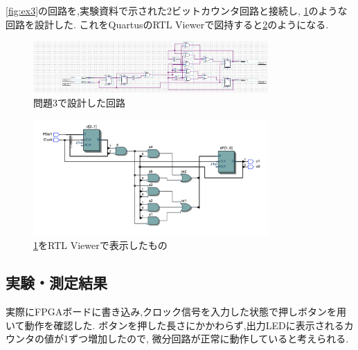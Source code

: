 \documentclass[autodetect-engine, dvi=dvipdfmx, 10pt, a4paper, ja=standard]{bxjsarticle}
\begin{document}
\ref{fig:ex3}の回路を,実験資料で示された2ビットカウンタ回路と接続し,
\ref{fig:ex3-cropped}のような回路を設計した.
これをQuartusのRTL Viewerで図持すると\ref{fig:ex3-rtl}のようになる.

\begin{figure}[H]
	\centering
	\includegraphics[width=0.8\textwidth]{asset/ex3-cropped.jpg}
	\caption{問題3で設計した回路}
	\label{fig:ex3-cropped}
\end{figure}

\begin{figure}[H]
	\centering
	\includegraphics[width=0.8\textwidth]{asset/ex3_pretty.png}
	\caption{\ref{fig:ex3-cropped}をRTL Viewerで表示したもの}
	\label{fig:ex3-rtl}
\end{figure}

\subsection{実験・測定結果}

実際にFPGAボードに書き込み,クロック信号を入力した状態で押しボタンを用いて動作を確認した.
ボタンを押した長さにかかわらず,出力LEDに表示されるカウンタの値が1ずつ増加したので,
微分回路が正常に動作していると考えられる.
\end{document}
